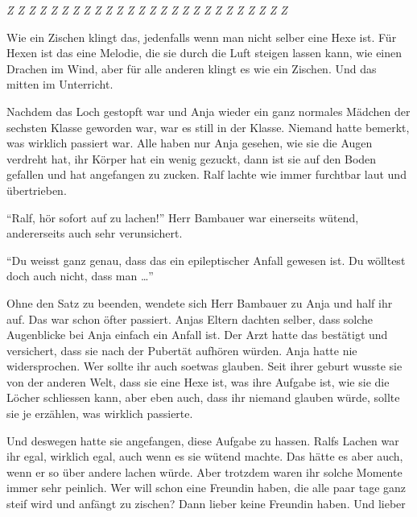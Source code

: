 \textit{\centering
{\fontsize{5}{15}\selectfont Z}
{\fontsize{5}{15}\selectfont Z}
{\fontsize{6}{15}\selectfont Z}
{\fontsize{7}{15}\selectfont Z}
{\fontsize{8}{16}\selectfont Z}
{\fontsize{13}{15}\selectfont Z}
{\fontsize{18}{15}\selectfont Z}
{\fontsize{21}{15}\selectfont Z}
{\fontsize{18}{15}\selectfont Z}
{\fontsize{13}{15}\selectfont Z}
{\fontsize{8}{15}\selectfont Z}
{\fontsize{12}{15}\selectfont Z}
{\fontsize{16}{15}\selectfont Z}
{\fontsize{20}{15}\selectfont Z}
{\fontsize{24}{15}\selectfont Z}
{\fontsize{27}{15}\selectfont Z}
{\fontsize{30}{15}\selectfont Z}
{\fontsize{27}{15}\selectfont Z}
{\fontsize{24}{15}\selectfont Z}
{\fontsize{20}{15}\selectfont Z}
{\fontsize{16}{15}\selectfont Z}
{\fontsize{12}{15}\selectfont Z}
{\fontsize{8}{15}\selectfont Z}
{\fontsize{7}{15}\selectfont Z}
{\fontsize{6}{15}\selectfont Z}
{\fontsize{5}{15}\selectfont Z}
}

Wie ein Zischen klingt das, jedenfalls wenn man nicht selber eine Hexe ist. Für Hexen ist das eine Melodie, die sie durch die Luft steigen lassen kann, wie einen Drachen im Wind, aber für alle anderen klingt es wie ein Zischen. Und das mitten im Unterricht.

Nachdem das Loch gestopft war und Anja wieder ein ganz normales Mädchen der sechsten Klasse geworden war, war es still in der Klasse. Niemand hatte bemerkt, was wirklich passiert war. Alle haben nur Anja gesehen, wie sie die Augen verdreht hat, ihr Körper hat ein wenig gezuckt, dann ist sie auf den Boden gefallen und hat angefangen zu zucken. Ralf lachte wie immer furchtbar laut und übertrieben. 

\enquote{Ralf, hör sofort auf zu lachen!} Herr Bambauer war einerseits wütend, andererseits auch sehr verunsichert.

\enquote{Du weisst ganz genau, dass das ein epileptischer Anfall gewesen ist. Du wölltest doch auch nicht, dass man \dots}

Ohne den Satz zu beenden, wendete sich Herr Bambauer zu Anja und half ihr auf. Das war schon öfter passiert. Anjas Eltern dachten selber, dass solche Augenblicke bei Anja einfach ein Anfall ist. Der Arzt hatte das bestätigt und versichert, dass sie nach der Pubertät aufhören würden. Anja hatte nie widersprochen. Wer sollte ihr auch soetwas glauben. Seit ihrer geburt wusste sie von der anderen Welt, dass sie eine Hexe ist, was ihre Aufgabe ist, wie sie die Löcher schliessen kann, aber eben auch, dass ihr niemand glauben würde, sollte sie je erzählen, was wirklich passierte.

Und deswegen hatte sie angefangen, diese Aufgabe zu hassen. Ralfs Lachen war ihr egal, wirklich egal, auch wenn es sie wütend machte. Das hätte es aber auch, wenn er so über andere lachen würde. Aber trotzdem waren ihr solche Momente immer sehr peinlich. Wer will schon eine Freundin haben, die alle paar tage ganz steif wird und anfängt zu zischen? Dann lieber keine Freundin haben. Und lieber 









